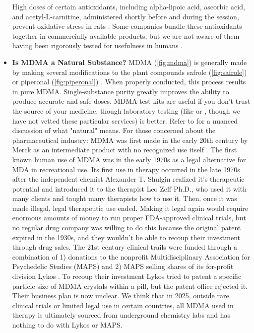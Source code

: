 \documentclass[12pt,letterpaper]{book}
\begin{document}
\begin{itemize}
        High doses of certain antioxidants, including alpha-lipoic acid, ascorbic acid, and acetyl-L-carnitine, administered shortly before and during the session, prevent oxidative stress in rats \cite{aguirre1999alpha,shankaran2001ascorbic,alves2009acetyl}. Some companies bundle these antioxidants together in commercially available products, but we are not aware of them having been rigorously tested for usefulness in humans \cite{rollKit}.
    \item \textbf{Is MDMA a Natural Substance?}
        MDMA (\ref{fig:mdma}) is generally made by making several modifications to the plant compounds safrole (\ref{fig:safrole}) or piperonal (\ref{fig:piperonal}) \cite{worldDrugReport,euMDMA}. When properly conducted, this process results in pure MDMA. Single-substance purity greatly improves the ability to produce accurate and safe doses. MDMA test kits are useful if you don't trust the source of your medicine, though laboratory testing (like \textcite{kykeonTesting} or \textcite{energyTesting}, though we have not vetted these particular services) is better. Refer to \textcite{ruggeriNatural} for a nuanced discussion of what "natural" means. For those concerned about the pharmaceutical industry: MDMA was first made in the early 20th century by Merck as an intermediate product with no recognized use itself \cite{passieHistory}. The first known human use of MDMA was in the early 1970s as a legal alternative for MDA in recreational use. Its first use in therapy occurred in the late 1970s after the independent chemist Alexander T. Shulgin realized it's therapeutic potential and introduced it to the therapist Leo Zeff Ph.D., who used it with many clients and taught many therapists how to use it. Then, once it was made illegal, legal therapeutic use ended. Making it legal again would require enormous amounts of money to run proper FDA-approved clinical trials, but no regular drug company was willing to do this because the original patent expired in the 1930s, and they wouldn't be able to recoup their investment through drug sales. The 21st century clinical trails were funded through a combination of 1) donations to the nonprofit Multidisciplinary Association for Psychedelic Studies (MAPS) and 2) MAPS selling shares of its for-profit division Lykos \cite{lykosPatents}. To recoup their investment Lykos tried to patent a specific particle size of MDMA crystals within a pill, but the patent office rejected it. Their business plan is now unclear. We think that in 2025, outside rare clinical trials or limited legal use in certain countries, all MDMA used in therapy is ultimately sourced from underground chemistry labs and has nothing to do with Lykos or MAPS.

\end{itemize}
\end{document}
